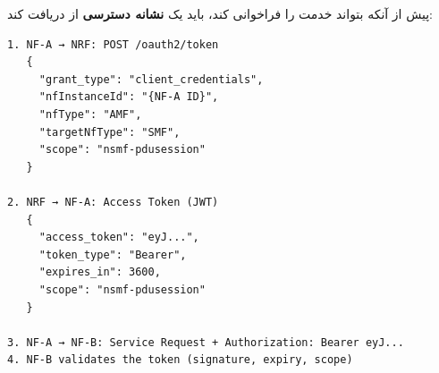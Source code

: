 


\CNchained{}



پیش از آنکه  بتواند خدمت  را فراخوانی کند، باید یک \textbf{نشانه دسترسی} از  دریافت کند:

\def\CNcodelang{}

\begin{CNplaincode}
\begin{Verbatim}
1. NF-A → NRF: POST /oauth2/token
   {
     "grant_type": "client_credentials",
     "nfInstanceId": "{NF-A ID}",
     "nfType": "AMF",
     "targetNfType": "SMF",
     "scope": "nsmf-pdusession"
   }
   
2. NRF → NF-A: Access Token (JWT)
   {
     "access_token": "eyJ...",
     "token_type": "Bearer",
     "expires_in": 3600,
     "scope": "nsmf-pdusession"
   }

3. NF-A → NF-B: Service Request + Authorization: Bearer eyJ...
4. NF-B validates the token (signature, expiry, scope)
\end{Verbatim}
\end{CNplaincode}




\CNchained{}




